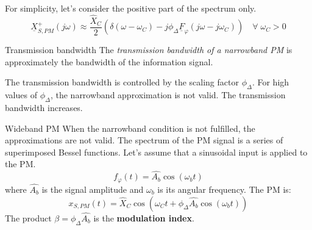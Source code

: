 \begin{refsection}
For simplicity, let's consider the positive part of the spectrum only.
\begin{equation}
	\underline{X}_{S,PM}^{+}\left(j\omega\right) \approx \frac{\hat{X}_C}{2} \left( \delta\left(\omega-\omega_C\right) - j \phi_{\Delta} \underline{F}_{\varphi}\left(j\omega-j\omega_C\right) \right) \quad \forall \; \omega_C > 0
\end{equation}

\begin{definition}{Transmission bandwidth}
	The  \emph{transmission bandwidth of a narrowband \ac{PM}} is approximately the bandwidth of the information signal.
\end{definition}

%
%

The transmission bandwidth is controlled by the scaling factor $\phi_{\Delta}$. For high values of $\phi_{\Delta}$, the narrowband approximation is not valid. The transmission bandwidth increases.

\begin{excursus}{Wideband \ac{PM}}
	When the narrowband condition is not fulfilled, the approximations are not valid. The spectrum of the \ac{PM} signal is a series of superimposed Bessel functions. Let's assume that a sinusoidal input is applied to the \ac{PM}.
	\begin{equation}
		f_{\varphi}(t) = \hat{A_b} \cos\left(\omega_b t\right)
	\end{equation}
	where $\hat{A_b}$ is the signal amplitude and $\omega_b$ is its angular frequency. The \ac{PM} is:
	\begin{equation}
		x_{S,PM}(t) = \hat{X}_C \cos\left(\omega_C t + \phi_{\Delta} \hat{A_b} \cos\left(\omega_b t\right)\right)
	\end{equation}
	The product $\beta = \phi_{\Delta} \hat{A_b}$ is the  \textbf{modulation index}.
	

\end{excursus}
\end{refsection}
